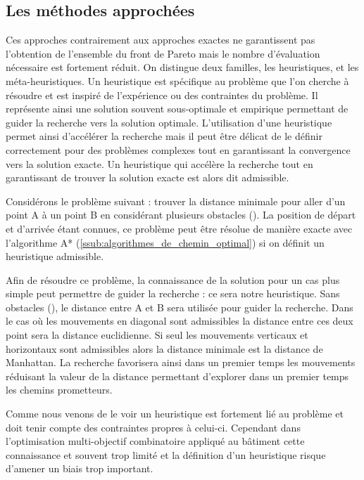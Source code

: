 \subsection{Les méthodes approchées} %
\label{sub:les_methodes_approchees}
Ces approches contrairement aux approches exactes ne garantissent pas l’obtention
de l’ensemble du front de Pareto mais le nombre d’évaluation nécessaire est fortement
réduit. On distingue deux familles, les heuristiques, et les méta-heuristiques.
Un heuristique est spécifique au problème que l’on cherche à résoudre et est
inspiré de l’expérience ou des contraintes du problème. Il représente ainsi une
solution souvent sous-optimale et empirique permettant de guider la recherche
vers la solution optimale. L’utilisation d’une heuristique permet ainsi d’accélérer
la recherche mais il peut être délicat de le définir correctement pour des problèmes
complexes tout en garantissant la convergence vers la solution exacte. Un heuristique
qui accélère la recherche tout en garantissant de trouver la solution exacte est alors
dit admissible.

Considérons le problème suivant : trouver la distance minimale pour aller d’un point
A à un point B en considérant plusieurs obstacles ().
La position de départ et d’arrivée étant connues, ce problème peut être résolue
de manière exacte avec l’algorithme A* (\ref{ssub:algorithmes_de_chemin_optimal})
si on définit un heuristique admissible.

Afin de résoudre ce problème, la connaissance de la solution pour un cas plus simple
peut permettre de guider la recherche : ce sera notre heuristique.
Sans obstacles (), le distance entre A et B sera utilisée pour
guider la recherche. Dans le cas où les mouvements en diagonal sont admissibles
la distance entre ces deux point sera la distance euclidienne. Si seul les mouvements
verticaux et horizontaux sont admissibles alors la distance minimale est la distance
de Manhattan.
La recherche favorisera ainsi dans un premier temps les mouvements réduisant la
valeur de la distance permettant d’explorer dans un premier temps les chemins
prometteurs.


Comme nous venons de le voir un heuristique est fortement lié au problème et doit tenir
compte des contraintes propres à celui-ci. Cependant dans l’optimisation multi-objectif combinatoire
appliqué au bâtiment cette connaissance et souvent trop limité et la définition d’un
heuristique risque d’amener un biais trop important.

